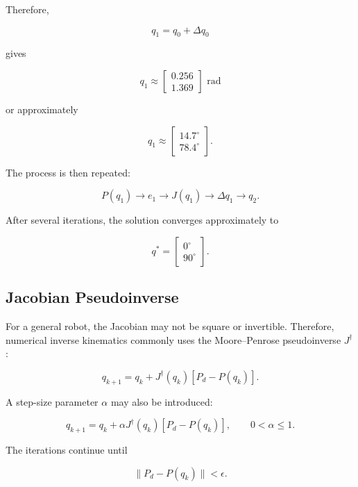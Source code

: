 \documentclass{article}
\begin{document}
Therefore,

\[
q_1
=
q_0+\Delta q_0
\]

gives

\[
q_1
\approx
\begin{bmatrix}
0.256\\
1.369
\end{bmatrix}
\text{ rad}
\]

or approximately

\[
q_1
\approx
\begin{bmatrix}
14.7^\circ\\
78.4^\circ
\end{bmatrix}.
\]

The process is then repeated:

\[
P(q_1)
\rightarrow
e_1
\rightarrow
J(q_1)
\rightarrow
\Delta q_1
\rightarrow
q_2.
\]

After several iterations, the solution converges approximately to

\[
\boxed{
q^*
=
\begin{bmatrix}
0^\circ\\
90^\circ
\end{bmatrix}.
}
\]


\subsection{Jacobian Pseudoinverse}

For a general robot, the Jacobian may not be square or invertible.
Therefore, numerical inverse kinematics commonly uses the
Moore--Penrose pseudoinverse $J^\dagger$:

\[
\boxed{
q_{k+1}
=
q_k+
J^\dagger(q_k)
\left[
P_d-P(q_k)
\right].
}
\]

A step-size parameter $\alpha$ may also be introduced:

\[
\boxed{
q_{k+1}
=
q_k+
\alpha J^\dagger(q_k)
\left[
P_d-P(q_k)
\right],
\qquad
0<\alpha\leq1.
}
\]

The iterations continue until

\[
\boxed{
\|P_d-P(q_k)\|<\epsilon.
}
\]
\end{document}
